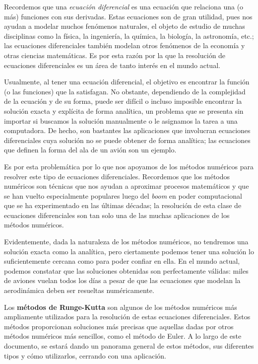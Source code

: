 \documentclass[12pt, a4paper]{article}
\begin{document}
\sffamily


\tableofcontents
\newpage

Recordemos que una \textit{ecuación diferencial} es una ecuación que relaciona una (o más) funciones con sus derivadas. Estas ecuaciones son de gran utilidad, pues nos ayudan a modelar muchos fenómenos naturales, el objeto de estudio de muchas disciplinas como la física, la ingeniería, la química, la biología, la astronomía, etc.; las ecuaciones diferenciales también modelan otros fenómenos de la economía y otras ciencias matemáticas. Es por esta razón por la que la resolución de ecuaciones diferenciales es un área de tanto interés en el mundo actual.

Usualmente, al tener una ecuación diferencial, el objetivo es encontrar la función (o las funciones) que la satisfagan. No obstante, dependiendo de la complejidad de la ecuación y de su forma, puede ser difícil o incluso imposible encontrar la solución exacta y explícita de forma analítica, un problema que se presenta sin importar si buscamos la solución manualmente o le asignamos la tarea a una computadora. De hecho, son bastantes las aplicaciones que involucran ecuaciones diferenciales cuya solución no se puede obtener de forma analítica; las ecuaciones que definen la forma del ala de un avión son un ejemplo.

Es por esta problemática por lo que nos apoyamos de los métodos numéricos para resolver este tipo de ecuaciones diferenciales. Recordemos que los métodos numéricos son técnicas que nos ayudan a aproximar procesos matemáticos y que se han vuelto especialmente populares luego del \textit{boom} en poder computacional que se ha experimentado en las últimas décadas; la resolución de esta clase de ecuaciones diferenciales son tan solo una de las muchas aplicaciones de los métodos numéricos.

Evidentemente, dada la naturaleza de los métodos numéricos, no tendremos una solución exacta como la analítica, pero ciertamente podemos tener una solución lo suficientemente cercana como para poder confiar en ella. En el mundo actual, podemos constatar que las soluciones obtenidas son perfectamente válidas: miles de aviones vuelan todos los días a pesar de que las ecuaciones que modelan la aerodinámica deben ser resueltas numéricamente.

Los \textbf{métodos de Runge-Kutta} son algunos de los métodos numéricos más ampliamente utilizados para la resolución de estas ecuaciones diferenciales. Estos métodos proporcionan soluciones más precisas que aquellas dadas por otros métodos numéricos más sencillos, como el método de Euler. A lo largo de este documento, se estará dando un panorama general de estos métodos, sus diferentes tipos y cómo utilizarlos, cerrando con una aplicación.
\end{document}
